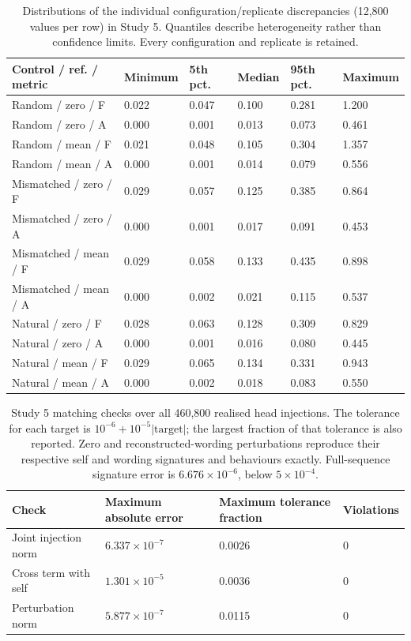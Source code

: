 \begin{table}[H]
\centering\footnotesize
\setlength{\tabcolsep}{3pt}
\caption{Distributions of the individual configuration/replicate discrepancies (12,800 values per row) in Study 5. Quantiles describe heterogeneity rather than confidence limits. Every configuration and replicate is retained.}
\label{tab:null-draw-distributions}
\begin{tabularx}{\linewidth}{@{}lYYYYY@{}}
\toprule
Control / ref. / metric & Minimum & 5th pct. & Median & 95th pct. & Maximum \\
\midrule
Random / zero / F & 0.022 & 0.047 & 0.100 & 0.281 & 1.200 \\
Random / zero / A & 0.000 & 0.001 & 0.013 & 0.073 & 0.461 \\
Random / mean / F & 0.021 & 0.048 & 0.105 & 0.304 & 1.357 \\
Random / mean / A & 0.000 & 0.001 & 0.014 & 0.079 & 0.556 \\
Mismatched / zero / F & 0.029 & 0.057 & 0.125 & 0.385 & 0.864 \\
Mismatched / zero / A & 0.000 & 0.001 & 0.017 & 0.091 & 0.453 \\
Mismatched / mean / F & 0.029 & 0.058 & 0.133 & 0.435 & 0.898 \\
Mismatched / mean / A & 0.000 & 0.002 & 0.021 & 0.115 & 0.537 \\
Natural / zero / F & 0.028 & 0.063 & 0.128 & 0.309 & 0.829 \\
Natural / zero / A & 0.000 & 0.001 & 0.016 & 0.080 & 0.445 \\
Natural / mean / F & 0.029 & 0.065 & 0.134 & 0.331 & 0.943 \\
Natural / mean / A & 0.000 & 0.002 & 0.018 & 0.083 & 0.550 \\
\bottomrule
\end{tabularx}
\end{table}

\begin{table}[H]
\centering\footnotesize
\setlength{\tabcolsep}{3pt}
\caption{Study 5 matching checks over all 460,800 realised head injections. The tolerance for each target is $10^{-6}+10^{-5}|\mathrm{target}|$; the largest fraction of that tolerance is also reported. Zero and reconstructed-wording perturbations reproduce their respective self and wording signatures and behaviours exactly. Full-sequence signature error is $6.676\times10^{-6}$, below $5\times10^{-4}$.}
\label{tab:null-calibration}
\begin{tabularx}{\linewidth}{@{}lYYY@{}}
\toprule
Check & Maximum absolute error & Maximum tolerance fraction & Violations \\
\midrule
Joint injection norm & $6.337\times10^{-7}$ & 0.0026 & 0 \\
Cross term with self & $1.301\times10^{-5}$ & 0.0036 & 0 \\
Perturbation norm & $5.877\times10^{-7}$ & 0.0115 & 0 \\
\bottomrule
\end{tabularx}
\end{table}

